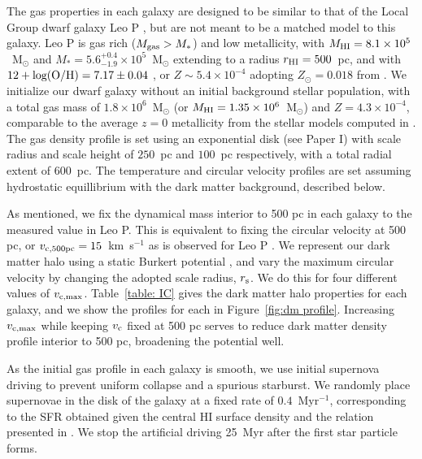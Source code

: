 \documentclass[twocolumn]{aastex61}
\begin{document}
The gas properties in each galaxy are designed to be similar to that of the Local Group dwarf galaxy Leo P \citep{Giovanelli2013,McQuinn2013,McQuinn2015a,McQuinn2015}, but are not meant to be a matched model to this galaxy. Leo P is gas rich ($M_{\rm gas} > M_{*}$) and low metallicity, with $M_{\rm HI} = 8.1\times 10^{5}$~M$_{\odot}$ and $M_{*} = 5.6^{+0.4}_{-1.9} \times 10^{5}$~M$_{\odot}$ \citep{McQuinn2015a} extending to a radius $r_{\rm HI} = 500$~pc, and with $12 + \rm{log(O/H)} = 7.17 \pm 0.04$ \citep{Skillman2013}, or $Z \sim 5.4\times10^{-4}$ adopting $Z_{\odot} = 0.018$ from \cite{Asplund2009}. We initialize our dwarf galaxy without an initial background stellar population, with a total gas mass of $1.8 \times 10^{6}$~M$_{\odot}$ (or $M_{\rm HI} = 1.35 \times 10^{6}$~M$_{\odot}$) and $Z = 4.3\times 10^{-4}$, comparable to the average $z = 0$ metallicity from the stellar models computed in \citep{McQuinn2015}. The gas density profile is set using an exponential disk (see Paper I) with scale radius and scale height of $250$~pc and $100$~pc respectively, with a total radial extent of 600~pc. The temperature and circular velocity profiles are set assuming hydrostatic equillibrium with the dark matter background, described below.


As mentioned, we fix the dynamical mass interior to 500 pc in each galaxy to the measured value in Leo P. This is equivalent to fixing the circular velocity at 500 pc, or $v_{\rm c, 500 \rm{pc}} = 15$~km~s$^{-1}$ as is observed for Leo P \citep{Bernstein-Cooper2014}. We represent our dark matter halo using a static Burkert potential \citep{Burkert1995}, and vary the maximum circular velocity by changing the adopted scale radius, $r_{\rm s}$. We do this for four different values of $v_{\rm c, max}$. Table~\ref{table: IC} gives the dark matter halo properties for each galaxy, and we show the profiles for each in Figure~\ref{fig:dm profile}. Increasing $v_{\rm c,max}$ while keeping $v_{\rm c}$ fixed at 500 pc serves to reduce dark matter density profile interior to 500 pc, broadening the potential well.

As the initial gas profile in each galaxy is smooth, we use initial supernova driving to prevent uniform collapse and a spurious starburst. We randomly place supernovae in the disk of the galaxy at a fixed rate of $0.4$~Myr$^{-1}$, corresponding to the SFR obtained given the central HI surface density and the relation presented in \citep{Roychowdhury2009}. We stop the artificial driving 25~Myr after the first star particle forms.
\end{document}
